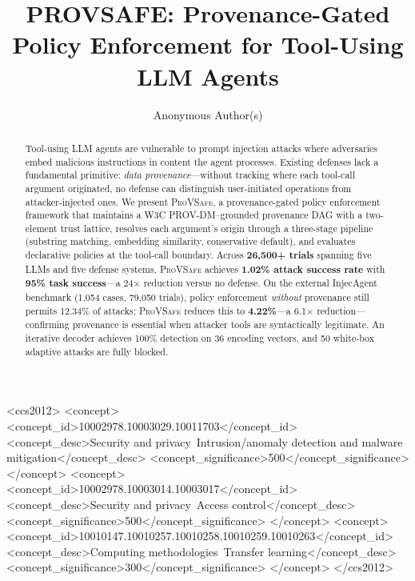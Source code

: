 \documentclass[sigconf,anonymous]{acmart}
\title{PROVSAFE: Provenance-Gated Policy Enforcement for Tool-Using LLM Agents}
\author{Anonymous Author(s)}
\affiliation{%
  \institution{Anonymous Institution}
}
\newcommand{\tool}{\textnormal{\textsc{ProVSafe}}}
\newcommand{\sys}{\tool}
\begin{document}
\begin{abstract}
Tool-using LLM agents are vulnerable to prompt injection attacks where adversaries embed malicious instructions in content the agent processes. Existing defenses lack a fundamental primitive: \emph{data provenance}---without tracking where each tool-call argument originated, no defense can distinguish user-initiated operations from attacker-injected ones. We present \sys{}, a provenance-gated policy enforcement framework that maintains a W3C PROV-DM--grounded provenance DAG with a two-element trust lattice, resolves each argument's origin through a three-stage pipeline (substring matching, embedding similarity, conservative default), and evaluates declarative policies at the tool-call boundary. Across \textbf{26{,}500+ trials} spanning five LLMs and five defense systems, \sys{} achieves \textbf{1.02\% attack success rate} with \textbf{95\% task success}---a 24$\times$ reduction versus no defense. On the external InjecAgent benchmark (1{,}054 cases, 79{,}050 trials), policy enforcement \emph{without} provenance still permits 12.34\% of attacks; \sys{} reduces this to \textbf{4.22\%}---a 6.1$\times$ reduction---confirming provenance is essential when attacker tools are syntactically legitimate. An iterative decoder achieves 100\% detection on 36 encoding vectors, and 50 white-box adaptive attacks are fully blocked.
\end{abstract}

\begin{CCSXML}
<ccs2012>
<concept>
<concept_id>10002978.10003029.10011703</concept_id>
<concept_desc>Security and privacy~Intrusion/anomaly detection and malware mitigation</concept_desc>
<concept_significance>500</concept_significance>
</concept>
<concept>
<concept_id>10002978.10003014.10003017</concept_id>
<concept_desc>Security and privacy~Access control</concept_desc>
<concept_significance>500</concept_significance>
</concept>
<concept>
<concept_id>10010147.10010257.10010258.10010259.10010263</concept_id>
<concept_desc>Computing methodologies~Transfer learning</concept_desc>
<concept_significance>300</concept_significance>
</concept>
</ccs2012>
\end{CCSXML}


\end{document}

